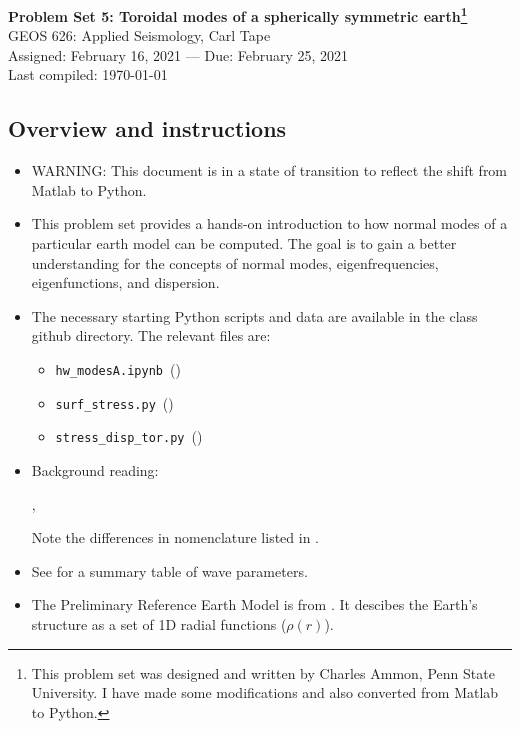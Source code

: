 \documentclass[11pt,titlepage,fleqn]{article}
\newcommand{\tfileA}{{\tt hw\_modesA.ipynb}}
\newcommand{\tfileB}{{\tt surf\_stress.py}}
\newcommand{\tfileC}{{\tt stress\_disp\_tor.py}}
\begin{document}

\begin{spacing}{1.2}
\centering
{\large \bf Problem Set 5: Toroidal modes of a spherically symmetric earth\footnote{This problem set was designed and written by Charles Ammon, Penn State University. I have made some modifications and also converted from Matlab to Python.}} \\
GEOS 626: Applied Seismology, Carl Tape \\
Assigned: February 16, 2021 --- Due: February 25, 2021 \\
Last compiled: \today \\
\end{spacing}


\subsection*{Overview and instructions}

\begin{itemize}
\item WARNING: This document is in a state of transition to reflect the shift from Matlab to Python.

\item This problem set provides a hands-on introduction to how normal modes of a particular earth model can be computed. The goal is to gain a better understanding for the concepts of normal modes, eigenfrequencies, eigenfunctions, and dispersion.

\item The necessary starting Python scripts and data are available in the class github directory. The relevant files are:
%
\begin{itemize}
\item \tfileA\ ()
\item \tfileB\ ()
\item \tfileC\ ()
\end{itemize}

\item Background reading:

\citet[][Section 2.9]{SteinWysession}, \citet[][Ch.~8]{DT}

Note the differences in nomenclature listed in .

\item See  for a summary table of wave parameters.

\item The Preliminary Reference Earth Model is from \citet{PREM}. It descibes the Earth's structure as a set of 1D radial functions (\eg $\rho(r)$).

\end{itemize}
\end{document}

